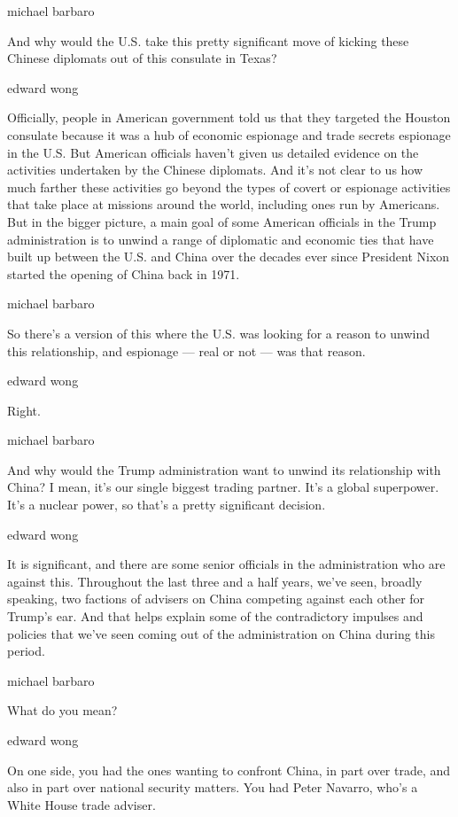 michael barbaro

And why would the U.S. take this pretty significant move of kicking
these Chinese diplomats out of this consulate in Texas?

edward wong

Officially, people in American government told us that they targeted the
Houston consulate because it was a hub of economic espionage and trade
secrets espionage in the U.S. But American officials haven't given us
detailed evidence on the activities undertaken by the Chinese diplomats.
And it's not clear to us how much farther these activities go beyond the
types of covert or espionage activities that take place at missions
around the world, including ones run by Americans. But in the bigger
picture, a main goal of some American officials in the Trump
administration is to unwind a range of diplomatic and economic ties that
have built up between the U.S. and China over the decades ever since
President Nixon started the opening of China back in 1971.

michael barbaro

So there's a version of this where the U.S. was looking for a reason to
unwind this relationship, and espionage --- real or not --- was that
reason.

edward wong

Right.

michael barbaro

And why would the Trump administration want to unwind its relationship
with China? I mean, it's our single biggest trading partner. It's a
global superpower. It's a nuclear power, so that's a pretty significant
decision.

edward wong

It is significant, and there are some senior officials in the
administration who are against this. Throughout the last three and a
half years, we've seen, broadly speaking, two factions of advisers on
China competing against each other for Trump's ear. And that helps
explain some of the contradictory impulses and policies that we've seen
coming out of the administration on China during this period.

michael barbaro

What do you mean?

edward wong

On one side, you had the ones wanting to confront China, in part over
trade, and also in part over national security matters. You had Peter
Navarro, who's a White House trade adviser.

